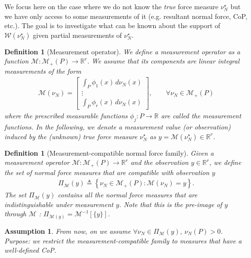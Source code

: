 \documentclass[11pt,a4paper]{article}
\theoremstyle{proposition}
\newtheorem{definition}[theorem]{Definition}
\newtheorem{assumption}[theorem]{Assumption}
\newcommand{\R}{\mathbb{R}}
\begin{document}
We focus here on the case where we do not know the \textit{true} force measure $\nu_N^\star$ but we have only access to some measurements of it (e.g. resultant normal force, CoP, etc.). 
The goal is to investigate what can be known about the support of $\mathcal W(\nu_N^\star)$ given partial measurements of $\nu_N^\star$. 
\begin{definition}[Measurement operator]\label{def:measurement_operator}
    We define a \textit{measurement operator} as a function $\mathcal M:\mathcal M_+(P)\rightarrow\mathbb R^r$. We assume that its components are linear integral measurements of the form
    \begin{align}
    \mathcal M(\nu_N) = 
    \begin{bmatrix}
    \displaystyle\int_P \phi_1(x)\,d\nu_N(x)\\
    \vdots\\
    \displaystyle\int_P \phi_r(x)\,d\nu_N(x)
    \end{bmatrix},\qquad \forall \nu_N \in \mathcal M_+(P)
    \end{align}
    where the prescribed measurable functions
    $\phi_j:P\rightarrow\mathbb R$ are called the \textit{measurement functions}.
    In the following, we denote a measurement value (or observation) induced by the (unknown) true force measure $\nu_N^\star$ as $y = \mathcal M(\nu_N^\star) \in\mathbb R^r$.
\end{definition}

\begin{definition}[Measurement-compatible normal force family]
    Given a measurement operator $\mathcal M:\mathcal M_+(P)\rightarrow\mathbb R^r$ and the observation $y\in\R^r$, we define the set of \textit{normal force measures that are compatible with observation $y$} 
    \begin{align}
    \Pi_{\mathcal M}(y) \triangleq\left\{\nu_N\in\mathcal M_+(P):\mathcal M(\nu_N)=y\right\}.
    \end{align}
    The set $\Pi_{\mathcal M}(y)$ contains all the normal force measures that are indistinguishable under measurement $y$. Note that this is the pre-image of $y$ through $\mathcal{M}$ : $\Pi_{\mathcal{M}(y)} = \mathcal{M}^{-1}[\{y\}]$.
\end{definition}

\begin{assumption}
    From now, on we assume \(\forall \nu_N\in\Pi_{\mathcal M}(y)\), $\nu_N(P) >0$. Purpose: we restrict the measurement-compatible family to measures that have a well-defined CoP.
\end{assumption}
\end{document}
